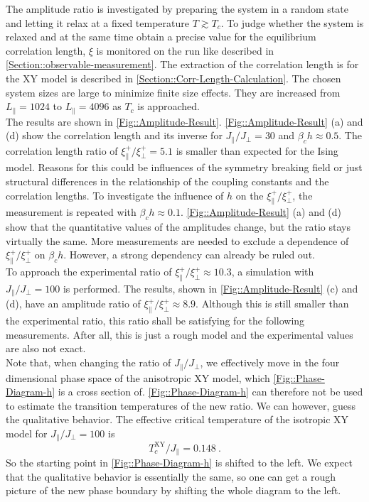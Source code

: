 	The amplitude ratio is investigated by preparing the system in a random state and letting it relax at a fixed temperature $T \gtrsim T_c$. To judge whether the system is relaxed and at the same time obtain a precise value for the equilibrium correlation length, $\xi$ is monitored on the run like described in \autoref{Section::observable-measurement}. The extraction of the correlation length is for the XY model is described in \autoref{Section::Corr-Length-Calculation}. The chosen system sizes are large to minimize finite size effects. They are increased from $L_\parallel =	1024$ to $L_\parallel =	4096$ as $T_c$ is approached. \\

	The results are shown in \autoref{Fig::Amplitude-Result}. \autoref{Fig::Amplitude-Result} (a) and (d) show the correlation length and its inverse for $J_\parallel /	J_\perp =	30$ and $\beta_c h \approx 0.5$. The correlation length ratio of $\xi_\parallel^+ /   \xi_\perp^+ = 5.1 $ is smaller than expected for the Ising model. Reasons for this could be influences of the symmetry breaking field or just structural differences in the relationship of the coupling constants and the correlation lengths. To investigate the influence of $h$ on the $\xi_\parallel^+ /   \xi_\perp^+$, the measurement is repeated with $\beta_c h \approx 0.1$. \autoref{Fig::Amplitude-Result} (a) and (d) show that the quantitative values of the amplitudes change, but the ratio stays virtually the same. More measurements are needed to exclude a dependence of $\xi^+_\parallel /	\xi^+_\perp$ on $\beta_c h$. However, a strong dependency can already be ruled out. \\
	
	To approach the experimental ratio of $\xi_\parallel^+ /	\xi_\perp^+ \approx 10.3$, a simulation with $J_\parallel /	J_\perp =	100$ is performed. The results, shown in \autoref{Fig::Amplitude-Result} (c) and (d), have an amplitude ratio of $\xi_{\parallel}^+ /	\xi_\perp^+  \approx  8.9$. Although this is still smaller than the experimental ratio, this ratio shall be satisfying for the following measurements. After all, this is just a rough model and the experimental values are also not exact. \\

	
	Note that, when changing the ratio of $J_\parallel /	J_\perp$, we effectively move in the four dimensional phase space of the anisotropic XY model, which \autoref{Fig::Phase-Diagram-h} is a cross section of. \autoref{Fig::Phase-Diagram-h} can therefore not be used to estimate the transition temperatures of the new ratio. We can however, guess the qualitative behavior. The effective critical temperature of the isotropic XY model for $J_\parallel /	J_\perp = 100$ is
	\begin{equation}
		T_c^{\text{XY}} /	J_\parallel =	0.148~.
	\end{equation}
	So the starting point in \autoref{Fig::Phase-Diagram-h} is shifted to the left. We expect that the qualitative behavior is essentially the same, so one can get a rough picture of the new phase boundary by shifting the whole diagram to the left.
	
